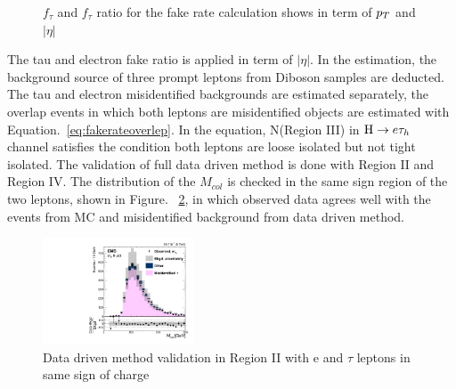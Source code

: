 \begin{figure}[htbp]
     \caption{$f_{\tau}$ and  $f_{\tau}$ ratio for the fake rate calculation shows in term of  $p_{T}$ and $|\eta|$}
     \label{fig:fakerationumberetau}
\end{figure}


The tau and electron fake ratio is applied in term of $|\eta|$. In the estimation, the background source of three prompt leptons from Diboson samples are deducted. The tau and electron misidentified backgrounds are estimated separately, the overlap events in which both leptons are misidentified objects are estimated with Equation.~\ref{eq:fakerateoverlep}. In the equation, N(Region III) in $\mathrm{H} \to e \tau_{h}$ channel satisfies the condition both leptons are loose isolated but not tight isolated.  The validation of full data driven method is done with Region II and Region IV. The distribution of the $M_{col}$ is checked in the same sign region of the two leptons, shown in Figure.~ \ref{fig:etaufakebackgroundValidationSS}, in which observed data agrees well with the events from MC and misidentified background from data driven method.


\begin{figure}[!tbp] 
\centering
\includegraphics[width=0.4\textwidth]{chapter6/etausamesign.pdf}
\caption{Data driven method validation in Region II with e and $\tau$ leptons in same sign of charge}
\label{fig:etaufakebackgroundValidationSS}
\end{figure}

